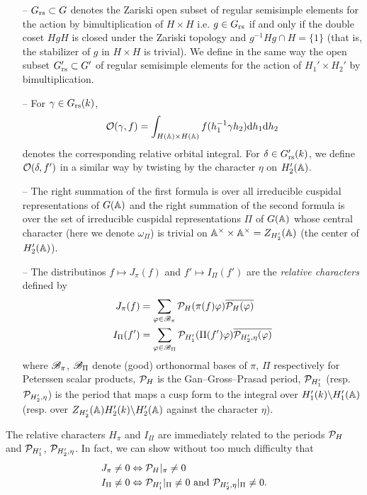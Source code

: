 \begin{itemize}
    \item[--] $G_{\mathrm{rs}} \subset G$ denotes the Zariski open subset of regular semisimple elements for the action by bimultiplication of $H \times H$ i.e. $g \in G_{\mathrm{rs}}$ if and only if the double coset $HgH$ is closed under the Zariski topology and $g^{-1} Hg \cap H = \{1\}$ (that is, the stabilizer of $g$ in $H \times H$ is trivial).
    We define in the same way the open subset $G_{\mathrm{rs}}' \subset G'$ of regular semisimple elements for the action of $H_1' \times H_2'$ by bimultiplication.
    \item[--] For $\gamma \in G_{\mathrm{rs}}(k)$,
    \[
        \mathcal{O}(\gamma, f) = \int_{H(\mathbb{A}) \times H(\mathbb{A})} f(h_1^{-1} \gamma h_2) \mathrm{d} h_1 \mathrm{d} h_2
    \]
    denotes the corresponding relative orbital integral.
    For $\delta \in G_{\mathrm{rs}}'(k)$, we define $\mathcal{O}(\delta, f')$ in a similar way by twisting by the character $\eta$ on $H_2'(\mathbb{A})$.
    \item[--] The right summation of the first formula is over all irreducible cuspidal representations of $G(\mathbb{A})$ and the right summation of the second formula is over the set of irreducible cuspidal representations $\Pi$ of $G(\mathbb{A})$ whose central character (here we denote $\omega_\Pi$) is trivial on $\mathbb{A}^\times \times \mathbb{A}^\times = Z_{H_2'}(\mathbb{A})$ (the center of $H_2'(\mathbb{A})$).
    \item[--] The distributinos $f \mapsto J_\pi(f)$ and $f'\mapsto I_\Pi(f')$ are the \emph{relative characters} defined by
    \begin{align*}
        J_\pi(f) &= \sum_{\varphi \in \mathscr{B}_\pi} \mathcal{P}_H(\pi(f) \varphi) \overline{\mathcal{P}_H(\varphi)} \\
        I_\Pi(f') &= \sum_{\varphi \in \mathscr{B}_\Pi} \mathcal{P}_{H_1'}(\Pi(f')\varphi) \overline{\mathcal{P}_{H_2', \eta}(\varphi)}
    \end{align*}
    where $\mathscr{B}_\pi$, $\mathscr{B}_\Pi$ denote (good) orthonormal bases of $\pi$, $\Pi$ respectively for Peterssen scalar products, $\mathcal{P}_H$ is the Gan--Gross--Prasad period, $\mathcal{P}_{H_1'}$ (resp. $\mathcal{P}_{H_2', \eta}$) is the period that maps a cusp form to the integral over $H_1'(k) \backslash H_1'(\mathbb{A})$ (resp. over $Z_{H_2'}(\mathbb{A}) H_2'(k) \backslash H_2'(\mathbb{A})$ against the character $\eta$).
\end{itemize}


The relative characters $H_\pi$ and $I_\Pi$ are immediately related to the periods $\mathcal{P}_H$ and $\mathcal{P}_{H_1'}$, $\mathcal{P}_{H_2', \eta}$.
In fact, we can show without too much difficulty that
\begin{align*}
    J_\pi \neq 0 &\Leftrightarrow \mathcal{P}_H|_\pi \neq 0 \\
    I_\Pi \neq 0 &\Leftrightarrow \mathcal{P}_{H_1'}|_{\Pi} \neq 0 \text{ and } \mathcal{P}_{H_2', \eta}|_\Pi \neq 0.
\end{align*}

